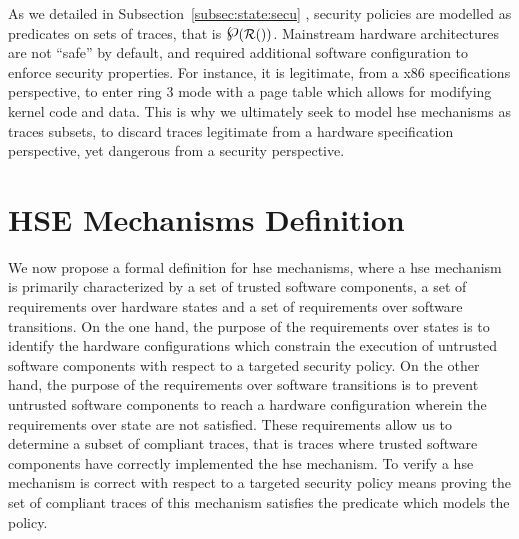 As we detailed in Subsection~\ref{subsec:state:secu} , security policies are modelled as predicates
on sets of traces, that is $\powerset (\pathesLTS{Ez})$.
%
Mainstream hardware architectures are not ``safe'' by default, and required
additional software configuration to enforce security properties.
%
For instance, it is legitimate, from a x86 specifications perspective, to enter
ring 3 mode with a page table which allows for modifying kernel code and data.
%
This is why we ultimately seek to model \ac{hse} mechanisms as traces subsets,
to discard traces legitimate from a hardware specification perspective, yet
dangerous from a security perspective.

\section{HSE Mechanisms Definition}
\label{sec:speccert:hse}

We now propose a formal definition for \ac{hse} mechanisms, where a \ac{hse}
mechanism is primarily characterized by a set of trusted software components, a
set of requirements over hardware states and a set of requirements over software
transitions.
%
On the one hand, the purpose of the requirements over states is to identify the
hardware configurations which constrain the execution of untrusted software
components with respect to a targeted security policy.
%
On the other hand, the purpose of the requirements over software transitions is
to prevent untrusted software components to reach a hardware configuration
wherein the requirements over state are not satisfied. 
%
These requirements allow us to determine a subset of compliant traces, that is
traces where trusted software components have correctly implemented the \ac{hse}
mechanism. 
%
To verify a \ac{hse} mechanism is correct with respect to a targeted security
policy means proving the set of compliant traces of this mechanism satisfies the
predicate which models the policy.

